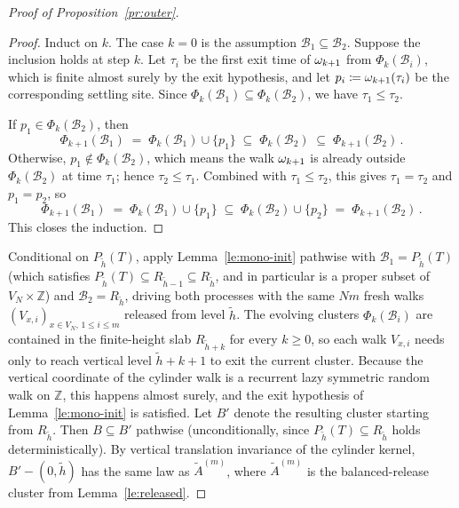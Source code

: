 \documentclass[11pt,a4paper,reqno]{amsart}
\theoremstyle{definition}
\newcommand{\bbZ}{{\ensuremath{\mathbb Z}} }
\begin{document}
\begin{proof}[Proof of Proposition~\ref{pr:outer}]
\begin{proof}
Induct on $k$. The case $k = 0$ is the assumption $\mathcal{B}_1 \subseteq \mathcal{B}_2$. Suppose the inclusion holds at step $k$. Let $\tau_i$ be the first exit time of $\omega_{k+1}$ from $\Phi_k(\mathcal{B}_i)$, which is finite almost surely by the exit hypothesis, and let $p_i \coloneqq \omega_{k+1}(\tau_i)$ be the corresponding settling site. Since $\Phi_k(\mathcal{B}_1) \subseteq \Phi_k(\mathcal{B}_2)$, we have $\tau_1 \leq \tau_2$.

If $p_1 \in \Phi_k(\mathcal{B}_2)$, then
\[
  \Phi_{k+1}(\mathcal{B}_1) \;=\; \Phi_k(\mathcal{B}_1) \cup \{p_1\} \;\subseteq\; \Phi_k(\mathcal{B}_2) \;\subseteq\; \Phi_{k+1}(\mathcal{B}_2)\,.
\]
Otherwise, $p_1 \notin \Phi_k(\mathcal{B}_2)$, which means the walk $\omega_{k+1}$ is already outside $\Phi_k(\mathcal{B}_2)$ at time $\tau_1$; hence $\tau_2 \leq \tau_1$. Combined with $\tau_1 \leq \tau_2$, this gives $\tau_1 = \tau_2$ and $p_1 = p_2$, so
\[
  \Phi_{k+1}(\mathcal{B}_1) \;=\; \Phi_k(\mathcal{B}_1) \cup \{p_1\} \;\subseteq\; \Phi_k(\mathcal{B}_2) \cup \{p_2\} \;=\; \Phi_{k+1}(\mathcal{B}_2)\,.
\]
This closes the induction.
\end{proof}

Conditional on $P_{\tilde h}(T)$, apply Lemma~\ref{le:mono-init} pathwise with $\mathcal{B}_1 = P_{\tilde h}(T)$ (which satisfies $P_{\tilde h}(T) \subseteq R_{\tilde h - 1} \subseteq R_{\tilde h}$, and in particular is a proper subset of $V_N \times \bbZ$) and $\mathcal{B}_2 = R_{\tilde h}$, driving both processes with the same $Nm$ fresh walks $(V_{x, i})_{x \in V_N,\, 1 \leq i \leq m}$ released from level $\tilde h$. The evolving clusters $\Phi_k(\mathcal{B}_i)$ are contained in the finite-height slab $R_{\tilde h + k}$ for every $k \geq 0$, so each walk $V_{x, i}$ needs only to reach vertical level $\tilde h + k + 1$ to exit the current cluster. Because the vertical coordinate of the cylinder walk is a recurrent lazy symmetric random walk on $\bbZ$, this happens almost surely, and the exit hypothesis of Lemma~\ref{le:mono-init} is satisfied. Let $B'$ denote the resulting cluster starting from $R_{\tilde h}$. Then $B \subseteq B'$ pathwise (unconditionally, since $P_{\tilde h}(T) \subseteq R_{\tilde h}$ holds deterministically). By vertical translation invariance of the cylinder kernel, $B' - (0, \tilde h)$ has the same law as $\widetilde A^{(m)}$, where $\widetilde A^{(m)}$ is the balanced-release cluster from Lemma~\ref{le:released}.


\end{proof}
\end{document}

